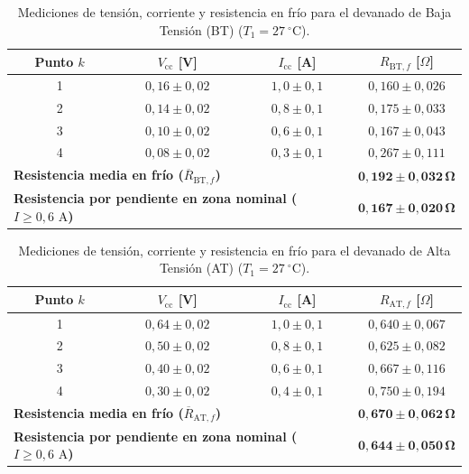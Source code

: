 \begin{table}[htbp]
    \centering
    \caption{Mediciones de tensión, corriente y resistencia en frío para el devanado de Baja Tensión (BT) ($T_1 = 27~^{\circ}\mathrm{C}$).}
    \label{tab:res_frio_bt}
    \begin{tabular}{c c c c}
        \toprule
        \textbf{Punto $k$} & \textbf{$V_{\text{cc}}$ [V]} & \textbf{$I_{\text{cc}}$ [A]} & \textbf{$R_{\text{BT},f}$ [$\Omega$]} \\
        \midrule
        1 & $0{,}16 \pm 0{,}02$ & $1{,}0 \pm 0{,}1$ & $0{,}160 \pm 0{,}026$ \\
        2 & $0{,}14 \pm 0{,}02$ & $0{,}8 \pm 0{,}1$ & $0{,}175 \pm 0{,}033$ \\
        3 & $0{,}10 \pm 0{,}02$ & $0{,}6 \pm 0{,}1$ & $0{,}167 \pm 0{,}043$ \\
        4 & $0{,}08 \pm 0{,}02$ & $0{,}3 \pm 0{,}1$ & $0{,}267 \pm 0{,}111$ \\
        \midrule
        \multicolumn{3}{l}{\textbf{Resistencia media en frío ($\overline{R}_{\text{BT},f}$)}} & $\mathbf{0{,}192 \pm 0{,}032\,\Omega}$ \\
        \multicolumn{3}{l}{\textbf{Resistencia por pendiente en zona nominal ($I \ge 0{,}6\text{ A}$)}} & $\mathbf{0{,}167 \pm 0{,}020\,\Omega}$ \\
        \bottomrule
    \end{tabular}
\end{table}

\begin{table}[htbp]
    \centering
    \caption{Mediciones de tensión, corriente y resistencia en frío para el devanado de Alta Tensión (AT) ($T_1 = 27~^{\circ}\mathrm{C}$).}
    \label{tab:res_frio_at}
    \begin{tabular}{c c c c}
        \toprule
        \textbf{Punto $k$} & \textbf{$V_{\text{cc}}$ [V]} & \textbf{$I_{\text{cc}}$ [A]} & \textbf{$R_{\text{AT},f}$ [$\Omega$]} \\
        \midrule
        1 & $0{,}64 \pm 0{,}02$ & $1{,}0 \pm 0{,}1$ & $0{,}640 \pm 0{,}067$ \\
        2 & $0{,}50 \pm 0{,}02$ & $0{,}8 \pm 0{,}1$ & $0{,}625 \pm 0{,}082$ \\
        3 & $0{,}40 \pm 0{,}02$ & $0{,}6 \pm 0{,}1$ & $0{,}667 \pm 0{,}116$ \\
        4 & $0{,}30 \pm 0{,}02$ & $0{,}4 \pm 0{,}1$ & $0{,}750 \pm 0{,}194$ \\
        \midrule
        \multicolumn{3}{l}{\textbf{Resistencia media en frío ($\overline{R}_{\text{AT},f}$)}} & $\mathbf{0{,}670 \pm 0{,}062\,\Omega}$ \\
        \multicolumn{3}{l}{\textbf{Resistencia por pendiente en zona nominal ($I \ge 0{,}6\text{ A}$)}} & $\mathbf{0{,}644 \pm 0{,}050\,\Omega}$ \\
        \bottomrule
    \end{tabular}
\end{table}

